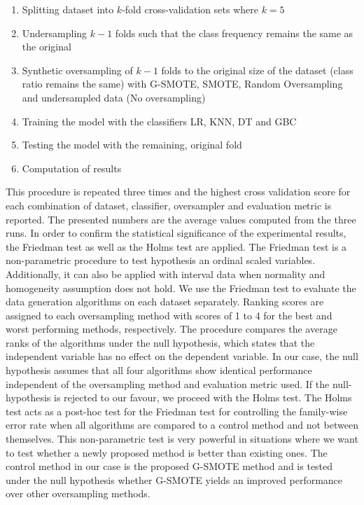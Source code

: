 \documentclass[parskip=full]{scrartcl}
\begin{document}
\begin{enumerate}
	\item 
	Splitting dataset into $\mathit{k}$-fold cross-validation sets where $\mathit{k = 5}$
	\item 
	Undersampling $\mathit{k - 1}$ folds such that the class frequency remains the same as the original
	\item 
	Synthetic oversampling of $\mathit{k - 1}$ folds to the original size of the dataset (class ratio remains the same) with G-SMOTE, SMOTE, Random Oversampling and undersampled data (No oversampling)
	\item 
	Training the model with the classifiers LR, KNN, DT and GBC
	\item 
	Testing the model with the remaining, original fold
	\item 
	Computation of results
\end{enumerate}	

This procedure is repeated three times and the highest cross validation score for each combination of dataset, classifier, oversampler and evaluation metric is reported. The presented numbers are the average values computed from the three runs. In order to confirm the statistical significance of the experimental results, the Friedman test \cite{Sheldon.1996} as well as the Holms test \cite{JanezDemsar.2006} are applied. The Friedman test is a non-parametric procedure to test hypothesis an ordinal scaled variables. Additionally, it can also be applied with interval data when normality and homogeneity assumption does not hold. We use the Friedman test to evaluate the data generation algorithms on each dataset separately. Ranking scores are assigned to each oversampling method with scores of 1 to 4 for the best and worst performing methods, respectively. The procedure compares the average ranks of the algorithms under the null hypothesis, which states that the independent variable has no effect on the dependent variable. In our case, the null hypothesis assumes that all four algorithms show identical performance independent of the oversampling method and evaluation metric used. If the null-hypothesis is rejected to our favour, we proceed with the Holms test. The Holms test acts as a post-hoc test for the Friedman test for controlling the family-wise error rate when all algorithms are compared to a control method and not between themselves. This non-parametric test is very powerful in situations where we want to test whether a newly proposed method is better than existing ones. The control method in our case is the proposed G-SMOTE method and is tested under the null hypothesis whether G-SMOTE yields an improved performance over other oversampling methods.
\end{document}
